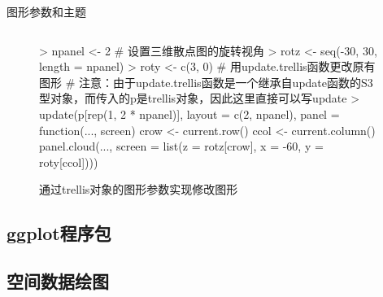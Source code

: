 \begin{frame}[t,fragile]{\subsecname}{图形参数和主题}
\begin{overlayarea}{\textwidth}{\textheight}
\begin{onlyenv}
\begin{figure}
\begin{columns}
    \begin{column}[c]{.6\textwidth}
\begin{rcode}
> npanel <- 2
# 设置三维散点图的旋转视角
> rotz <- seq(-30, 30, length = npanel)
> roty <- c(3, 0)
# 用update.trellis函数更改原有图形
# 注意：由于update.trellis函数是一个继承自update函数的S3型对象，而传入的p是trellis对象，因此这里直接可以写update
> update(p[rep(1, 2 * npanel)], 
         layout = c(2, npanel),
         panel = function(..., screen) {
           crow <- current.row()
           ccol <- current.column()
         panel.cloud(..., screen = list(z = rotz[crow], x = -60, y = roty[ccol]))})
\end{rcode}
    \end{column}
  \end{columns}
  \caption{通过trellis对象的图形参数实现修改图形}
\end{figure}
\end{onlyenv}
\end{overlayarea}
\end{frame}
\subsection{ggplot程序包}

\subsection{空间数据绘图}
